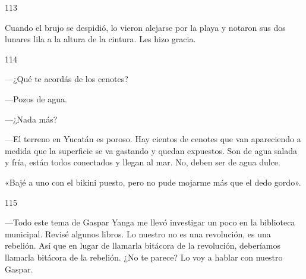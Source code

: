 \documentclass[12pt,twoside,openright,a5paper]{book}
\begin{document}
\hrulefill \hspace{0.1cm}\decofourleft\hspace{0.2cm} 113 \hspace{0.2cm}\decofourright \hspace{0.1cm}\hrulefill

\nopagebreak

\vspace{0.5cm}

\nopagebreak

Cuando el brujo se despidió, lo vieron alejarse por la playa y notaron sus dos lunares
lila a la altura de la cintura. Les hizo gracia.

\vspace{0.5cm}

\hrulefill \hspace{0.1cm}\decofourleft\hspace{0.2cm} 114 \hspace{0.2cm}\decofourright \hspace{0.1cm}\hrulefill

\nopagebreak

\vspace{0.5cm}

\nopagebreak

---¿Qué te acordás de los cenotes?

---Pozos de agua.

---¿Nada más?

---El terreno en Yucatán es poroso. Hay cientos de cenotes que van apareciendo a medida
que la superficie se va gastando y quedan expuestos. Son de agua salada
y fría, están todos conectados y llegan al mar. No, deben ser de agua
dulce.

«Bajé a uno con el bikini puesto, pero no pude mojarme más que el dedo gordo».


\vspace{0.5cm}
\afterpage{}
\hrulefill \hspace{0.1cm}\decofourleft\hspace{0.2cm} 115 \hspace{0.2cm}\decofourright \hspace{0.1cm}\hrulefill

\nopagebreak

\vspace{0.5cm}

\nopagebreak

---Todo este tema de Gaspar Yanga me llevó investigar un poco en
la biblioteca municipal. Revisé algunos libros. Lo nuestro no es
una revolución, es una rebelión. Así que en lugar de
llamarla bitácora de la revolución, deberíamos llamarla bitácora de la
rebelión. ¿No te parece? Lo voy a hablar con nuestro Gaspar.
\end{document}
